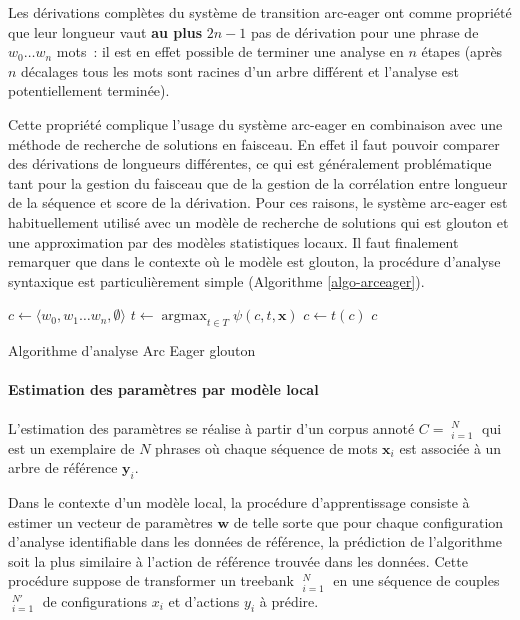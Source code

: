 \documentclass[11pt,openany]{book}
\begin{document}
Les dérivations complètes du système de transition arc-eager ont comme
propriété que leur longueur vaut {\bf au plus} $2n-1$ pas de dérivation pour une
phrase de $w_0\ldots w_n$ mots~: il est en effet possible de terminer
une analyse en $n$ étapes (après $n$ décalages tous les mots sont
racines d'un arbre différent et l'analyse est potentiellement terminée). 

Cette propriété complique l'usage du système arc-eager en
combinaison avec une méthode de recherche de solutions en faisceau.
En effet il faut pouvoir comparer des dérivations de longueurs
différentes, ce qui est généralement problématique tant pour la 
gestion du faisceau que de la gestion de la corrélation entre longueur
de la séquence et score de la dérivation.
Pour ces raisons, le système arc-eager est habituellement utilisé avec
un modèle de recherche de solutions qui est glouton et une
approximation par des modèles statistiques locaux.
Il faut finalement remarquer que dans le contexte où le modèle est glouton, la
procédure d'analyse syntaxique est particulièrement simple (Algorithme
\ref{algo-arceager}).
\begin{algorithm}[htbp]
\begin{algorithmic}[0]
\State $c \gets \langle w_0, w_1\ldots w_n,\emptyset\rangle$
\State $t \gets \mathop{\text{argmax}}_{t\in T} \psi(c,t,\mathbf{x})$
\State $c \gets t(c)$
\EndWhile
\State \Return $c$
\EndFunction
\end{algorithmic}
\caption{\label{algo-arceager}Algorithme d'analyse Arc Eager glouton}
\end{algorithm}




\paragraph{Estimation des paramètres par modèle local}
L'estimation des paramètres se réalise à partir d'un 
corpus annoté $C = \mathop{(\mathbf{x}_i,\mathbf{y}_i)}^N_{i=1}$ qui est un
exemplaire de $N$ phrases où chaque séquence de mots $\mathbf{x}_i$
est associée à un arbre de référence $\mathbf{y}_i$.

Dans le contexte d'un modèle local, la procédure d'apprentissage consiste à estimer un vecteur de
paramètres $\mathbf{w}$ de telle sorte que pour chaque configuration
d'analyse identifiable dans les données de référence, la prédiction de
l'algorithme soit la plus similaire à l'action de référence trouvée
dans les données. Cette procédure suppose de transformer un treebank
$\mathop{(\mathbf{x}_i,\mathbf{y}_i)}^N_{i=1}$
en une séquence de couples $\mathop{(x_i,y_i)}_{i=1}^{N'}$
de configurations $x_i$ et d'actions $y_i$ à prédire.
\end{document}
